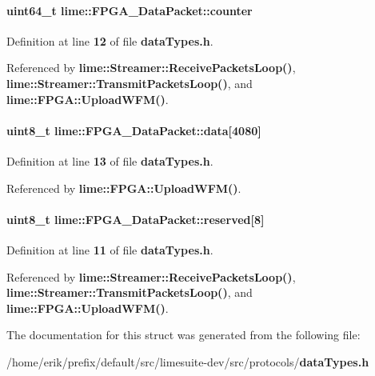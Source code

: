 \paragraph[{counter}]{\setlength{\rightskip}{0pt plus 5cm}uint64\+\_\+t lime\+::\+F\+P\+G\+A\+\_\+\+Data\+Packet\+::counter}\label{structlime_1_1FPGA__DataPacket_a7103be181090ccf3c4b9f5e9f8758dea}


Definition at line {\bf 12} of file {\bf data\+Types.\+h}.



Referenced by {\bf lime\+::\+Streamer\+::\+Receive\+Packets\+Loop()}, {\bf lime\+::\+Streamer\+::\+Transmit\+Packets\+Loop()}, and {\bf lime\+::\+F\+P\+G\+A\+::\+Upload\+W\+F\+M()}.

\paragraph[{data}]{\setlength{\rightskip}{0pt plus 5cm}uint8\+\_\+t lime\+::\+F\+P\+G\+A\+\_\+\+Data\+Packet\+::data[4080]}\label{structlime_1_1FPGA__DataPacket_a3789a228bde7732e467655390c33b4a6}


Definition at line {\bf 13} of file {\bf data\+Types.\+h}.



Referenced by {\bf lime\+::\+F\+P\+G\+A\+::\+Upload\+W\+F\+M()}.

\paragraph[{reserved}]{\setlength{\rightskip}{0pt plus 5cm}uint8\+\_\+t lime\+::\+F\+P\+G\+A\+\_\+\+Data\+Packet\+::reserved[8]}\label{structlime_1_1FPGA__DataPacket_a464b826e1201c770850e325cc255a6ac}


Definition at line {\bf 11} of file {\bf data\+Types.\+h}.



Referenced by {\bf lime\+::\+Streamer\+::\+Receive\+Packets\+Loop()}, {\bf lime\+::\+Streamer\+::\+Transmit\+Packets\+Loop()}, and {\bf lime\+::\+F\+P\+G\+A\+::\+Upload\+W\+F\+M()}.



The documentation for this struct was generated from the following file\+:\begin{DoxyCompactItemize}
\item 
/home/erik/prefix/default/src/limesuite-\/dev/src/protocols/{\bf data\+Types.\+h}\end{DoxyCompactItemize}
